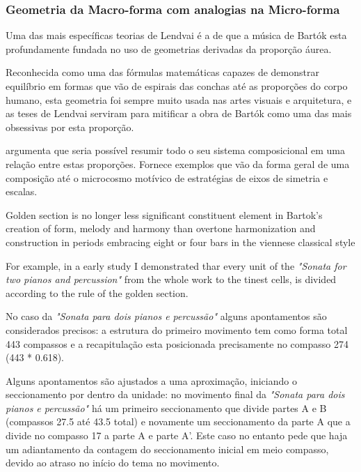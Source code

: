 \documentclass[
	12pt,				%
	openright,			%
	twoside,			%
	a4paper,			%
	english,			%
	french,				%
	spanish,			%
	brazil				%
	]{abntex2}
\begin{document}
\pagebreak
\subsubsection{Geometria da Macro-forma com analogias na Micro-forma}

Uma das mais específicas teorias de Lendvai é a de que a música de Bartók esta profundamente fundada no uso de geometrias derivadas da proporção áurea. 

Reconhecida como uma das fórmulas matemáticas capazes de demonstrar equilíbrio em formas que vão de espirais das conchas até as proporções do corpo humano, esta geometria foi sempre muito usada nas artes visuais e arquitetura, e as teses de Lendvai serviram para mitificar a obra de Bartók como uma das mais obsessivas por esta proporção.

 argumenta que seria possível resumir todo o seu sistema composicional em uma relação entre estas proporções. Fornece exemplos que vão da forma geral de uma composição até o microcosmo motívico de estratégias de eixos de simetria e escalas.


\begin{citacao}
Golden section is no longer less significant constituent element in Bartok's creation of form, melody and harmony than overtone harmonization and construction in periods embracing eight or four bars in the viennese classical style

For example, in a early study I demonstrated thar every unit of the \textit{"Sonata for two pianos and percussion"} from the whole work to the tinest cells, is divided according to the rule of the golden section.\cite[ p.175]{lendvai1962duality}
\end{citacao}

No caso da \textit{"Sonata para dois pianos e percussão"} alguns apontamentos são considerados precisos: a estrutura do primeiro movimento tem como forma total 443 compassos e a recapitulação esta posicionada precisamente no compasso 274 (443 * 0.618).

Alguns apontamentos são ajustados a uma aproximação, iniciando o seccionamento por dentro da unidade: no movimento final da \textit{"Sonata para dois pianos e percussão"} há um primeiro seccionamento que divide partes A e B (compassos 27.5 até 43.5 total) e novamente um seccionamento da parte A que a divide no compasso 17 a parte A e parte A'. Este caso no entanto pede que haja um adiantamento da contagem do seccionamento inicial em meio compasso, devido ao atraso no início do tema no movimento.
\end{document}
